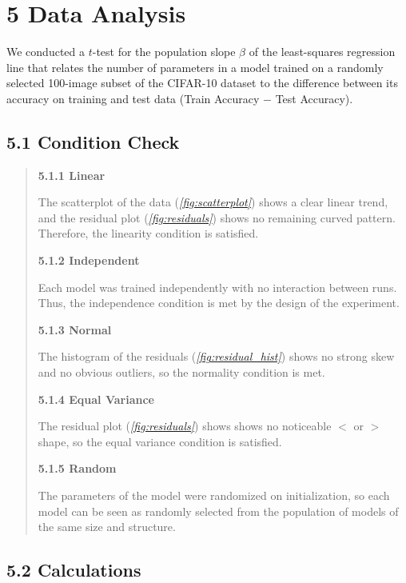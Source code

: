 \documentclass[12pt]{article}
\begin{document}
    \section*{5 Data Analysis}

    We conducted a $t$-test for the population slope $\beta$ of the least-squares regression line that relates the number of parameters in a model trained on a randomly selected 100-image subset of the CIFAR-10 dataset to the difference between its accuracy on training and test data (Train Accuracy $-$ Test Accuracy).

    \subsection*{5.1 Condition Check}

    \begin{quote}

    \textbf{5.1.1 Linear}

    The scatterplot of the data (\textit{\autoref{fig:scatterplot}}) shows a clear linear trend, and the residual plot (\textit{\autoref{fig:residuals}}) shows no remaining curved pattern.
    Therefore, the linearity condition is satisfied.

    \textbf{5.1.2 Independent}

    Each model was trained independently with no interaction between runs. Thus, the independence condition is met by the design of the experiment.

    \textbf{5.1.3 Normal}

    The histogram of the residuals (\textit{\autoref{fig:residual_hist}}) shows no strong skew and no obvious outliers,
    so the normality condition is met.

    \textbf{5.1.4 Equal Variance}

    The residual plot (\textit{\autoref{fig:residuals}}) shows shows no noticeable $<$ or $>$ shape, so the equal variance condition is satisfied.

    \textbf{5.1.5 Random}

    The parameters of the model were randomized on initialization, so each model can be seen as randomly selected from the population
    of models of the same size and structure.

    \end{quote}

    \subsection*{5.2 Calculations}
\end{document}

